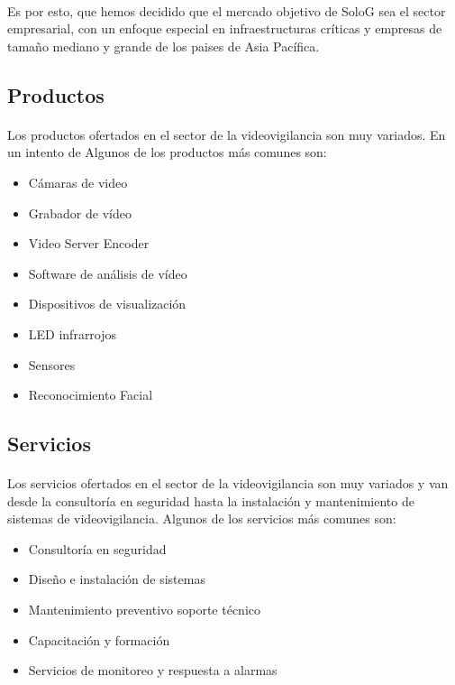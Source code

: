 \documentclass{report}
\begin{document}
        \paragraph{}{
          Es por esto, que hemos decidido que el mercado objetivo de SoloG sea el sector empresarial, con un enfoque especial en infraestructuras críticas y empresas de tamaño mediano y grande de los paises de Asia Pacífica.
        }
        \subsection{Productos}
          \paragraph*{}
          {
            Los productos ofertados en el sector de la videovigilancia son muy variados.
            En un intento de 
            Algunos de los productos más comunes son: \cite{wiki-videovigilancia-ip}
          }
          \begin{multicols}{2}
            \begin{itemize}
              \item Cámaras de video
              \item Grabador de vídeo 
              \item Video Server Encoder
              \item Software de análisis de vídeo
              \item Dispositivos de visualización
              \item LED infrarrojos
              \item Sensores
              \item Reconocimiento Facial
            \end{itemize}
          \end{multicols}
        \subsection{Servicios}
          \paragraph*{}
          {
            Los servicios ofertados en el sector de la videovigilancia son muy variados y van desde la consultoría en seguridad hasta la instalación y mantenimiento de sistemas de videovigilancia. 
            Algunos de los servicios más comunes son: \cite{wiki-videovigilancia-ip}
          }
          \begin{itemize}
            \item Consultoría en seguridad
            \item Diseño e instalación de sistemas
            \item Mantenimiento preventivo soporte técnico
            \item Capacitación y formación
            \item Servicios de monitoreo y respuesta a alarmas
          \end{itemize}
\end{document}
